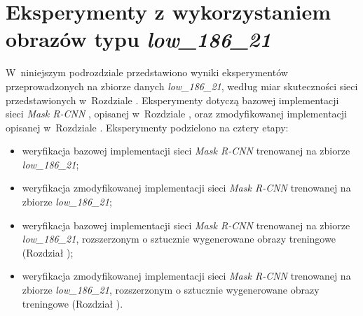 \section{Eksperymenty z wykorzystaniem obrazów typu \textit{low\_186\_21}}
\label{sec:experymenty_low}
W~niniejszym podrozdziale przedstawiono wyniki eksperymentów przeprowadzonych na zbiorze danych \textit{low\_186\_21}, według miar skuteczności sieci przedstawionych w~Rozdziale .
Eksperymenty dotyczą bazowej implementacji sieci \textit{Mask R-CNN} \cite{matterport-mask-rcnn}, opisanej w~Rozdziale , oraz zmodyfikowanej implementacji opisanej w~Rozdziale .
Eksperymenty podzielono na cztery etapy:

\begin{itemize}
 \item weryfikacja bazowej implementacji sieci \textit{Mask R-CNN} trenowanej na zbiorze \textit{low\_186\_21};
 \item weryfikacja zmodyfikowanej implementacji sieci \textit{Mask R-CNN} trenowanej na zbiorze \textit{low\_186\_21};
 \item weryfikacja bazowej implementacji sieci \textit{Mask R-CNN} trenowanej na zbiorze \textit{low\_186\_21}, rozszerzonym o sztucznie wygenerowane obrazy treningowe (Rozdział );
 \item weryfikacja zmodyfikowanej implementacji sieci \textit{Mask R-CNN} trenowanej na zbiorze \textit{low\_186\_21}, rozszerzonym o sztucznie wygenerowane obrazy treningowe (Rozdział ).
\end{itemize}
